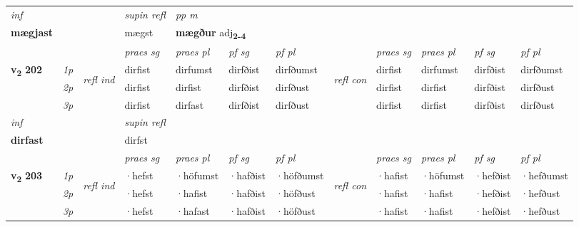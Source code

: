 \begin{longtable}[l]{X>{\footnotesize\itshape}llXXXXlXXXX}
   {\textit{inf}} & &       & \textit{supin refl} & \textit{pp m} \\*
  {\textbf{mægjast}} & &       & mægst & \multicolumn{2}{l}{\textbf{mægður} adj\textbf{\textsubscript{2-4}}} \\*

\midrule

 & &   & \textit{praes sg}  & \textit{praes pl}    & \textit{ pf sg} & \textit{pf pl} & & \textit{praes sg}  & \textit{praes pl}    & \textit{pf sg} & \textit{pf pl }  \\ \cmidrule{4-7} \cmidrule{9-12}
 \multirow{2}{*}{{{\textbf{v{\textsubscript{2}}} \Large{\textbf{202}}}}}  & 1p & \multirow{3}{*}{\begin{turn}{90}\textit{refl ind}\end{turn}}  & dirfist & dirfumst & dirfðist & dirfðumst & \multirow{3}{*}{\begin{turn}{90}\textit{refl con}\end{turn}}  &dirfist & dirfumst & dirfðist & dirfðumst \\*
 & 2p &  & dirfist & dirfist & dirfðist & dirfðust & &dirfist & dirfist & dirfðist & dirfðust \\*
 & 3p  & & dirfist & dirfast & dirfðist & dirfðust & & dirfist & dirfist& dirfðist & dirfðust \\*
\cmidrule{4-7} \cmidrule{9-12}

   {\textit{inf}} & &       & \textit{supin refl}  \\*
  {\textbf{dirfast}} & &       & dirfst  \\*

\midrule

 & &   & \textit{praes sg}  & \textit{praes pl}    & \textit{ pf sg} & \textit{pf pl} & & \textit{praes sg}  & \textit{praes pl}    & \textit{pf sg} & \textit{pf pl }  \\ \cmidrule{4-7} \cmidrule{9-12}
 \multirow{2}{*}{{{\textbf{v{\textsubscript{2}}} \Large{\textbf{203}}}}}  & 1p & \multirow{3}{*}{\begin{turn}{90}\textit{refl ind}\end{turn}}  & ·hefst & ·höfumst & ·hafðist & ·höfðumst & \multirow{3}{*}{\begin{turn}{90}\textit{refl con}\end{turn}}  &·hafist & ·höfumst & ·hefðist & ·hefðumst \\*
 & 2p &  & ·hefst & ·hafist & ·hafðist & ·höfðust & &·hafist & ·hafist & ·hefðist & ·hefðust \\*
 & 3p  & & ·hefst & ·hafast & ·hafðist & ·höfðust & & ·hafist & ·hafist& ·hefðist & ·hefðust \\*
\cmidrule{4-7} \cmidrule{9-12}


\end{longtable}
